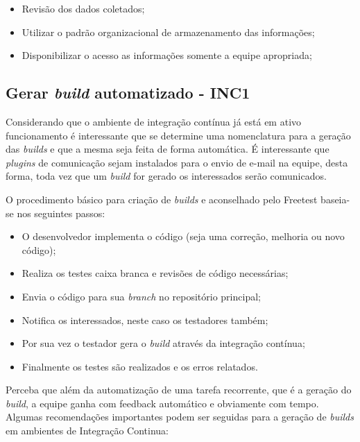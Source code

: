 \begin{itemize}
    \item Revisão dos dados coletados;
    \item Utilizar o padrão organizacional de armazenamento das informações;
    \item Disponibilizar o acesso as informações somente a equipe apropriada;
\end{itemize}

\subsection{Gerar \textit{build} automatizado - INC1}
\label{sec:guiainc1}

Considerando que o ambiente de integração contínua já está em ativo funcionamento é interessante que se determine uma nomenclatura para a geração das \textit{builds} e que a mesma seja feita de forma automática. É interessante que \textit{plugins} de comunicação sejam instalados para o envio de e-mail na equipe, desta forma, toda vez que um \textit{build} for gerado os interessados serão comunicados.

O procedimento básico para criação de \textit{builds} e aconselhado pelo Freetest baseia-se nos seguintes passos:

\begin{itemize}
    \item O desenvolvedor implementa o código (seja uma correção, melhoria ou novo código);
    \item Realiza os testes caixa branca e revisões de código necessárias;
    \item Envia o código para sua \textit{branch} no repositório principal;
    \item Notifica os interessados, neste caso os testadores também;
    \item Por sua vez o testador gera o \textit{build} através da integração contínua;
    \item Finalmente os testes são realizados e os erros relatados.
\end{itemize}

Perceba que além da automatização de uma tarefa recorrente, que é a geração do \textit{build}, a equipe ganha com feedback automático e obviamente com tempo. Algumas recomendações importantes podem ser seguidas para a geração de \textit{builds} em ambientes de Integração Continua:

